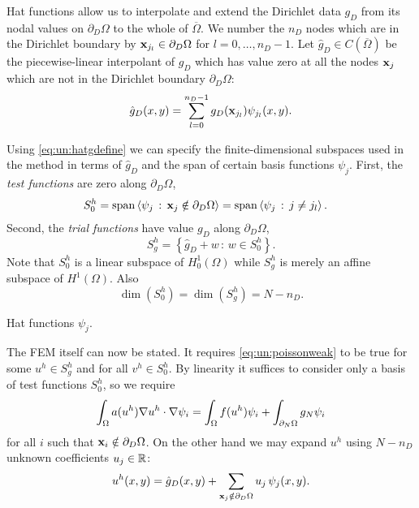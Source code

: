Hat functions allow us to interpolate and extend the Dirichlet data $g_D$ from its nodal values on $\partial_D \Omega$ to the whole of $\overline\Omega$.  We number the $n_D$ nodes which are in the Dirichlet boundary by $\mathbf{x}_{j_l} \in \partial_D\Omega$ for $l=0,\dots,n_D-1$.  Let $\hat g_D \in C(\overline\Omega)$ be the piecewise-linear interpolant of $g_D$ which has value zero at all the nodes $\mathbf{x}_j$ which are not in the Dirichlet boundary $\partial_D \Omega$:
\begin{equation}
\hat g_D(x,y) = \sum_{l=0}^{n_D-1} g_D(\mathbf{x}_{j_l}) \psi_{j_l}(x,y). \label{eq:un:hatgdefine}
\end{equation}

Using \eqref{eq:un:hatgdefine} we can specify the finite-dimensional subspaces used in the method in terms of $\hat g_D$ and the span of certain basis functions $\psi_j$.  First, the \emph{test functions} are zero along $\partial_D \Omega$,
\begin{align*}
S_{0}^h &= \operatorname{span}\left<\psi_j \,:\, \mathbf{x}_j \notin \partial_D \Omega\right> = \operatorname{span}\left<\psi_j \,:\, j \neq j_l\right>.
\end{align*}
Second, the \emph{trial functions} have value $g_D$ along $\partial_D \Omega$,
\begin{equation}
S_{g}^h = \left\{\hat g_D + w \,:\, w \in S_{0}^h\right\}.
\end{equation}
Note that $S_{0}^h$ is a linear subspace of $H_{0}^1(\Omega)$ while $S_{g}^h$ is merely an affine subspace of $H^1(\Omega)$.  Also
\begin{equation}
\dim(S_{0}^h)=\dim(S_{g}^h)=N-n_D.
\end{equation}

\begin{marginfigure}

\caption{Hat functions $\psi_j$.}
\label{fig:un:hatfunction}
\end{marginfigure}

The FEM itself can now be stated.  It requires \eqref{eq:un:poissonweak} to be true for some $u^h\in S_{g}^h$ and for all $v^h\in S_{0}^h$.  By linearity it suffices to consider only a basis of test functions $S_{0}^h$, so we require
\begin{equation}
\int_\Omega a(u^h) \nabla u^h \cdot \nabla \psi_i = \int_\Omega f(u^h) \psi_i + \int_{\partial_N\Omega} g_N \psi_i \label{eq:un:weakformhat}
\end{equation}
for all $i$ such that $\mathbf{x}_i \notin \partial_D \Omega$.  On the other hand we may expand $u^h$ using $N-n_D$ unknown coefficients $u_j\in\mathbb{R}$:
\begin{equation}
u^h(x,y) = \hat g_D(x,y) + \sum_{\mathbf{x}_j \notin \partial_D \Omega} u_j\, \psi_j(x,y). \label{eq:un:uhexpand}
\end{equation}

